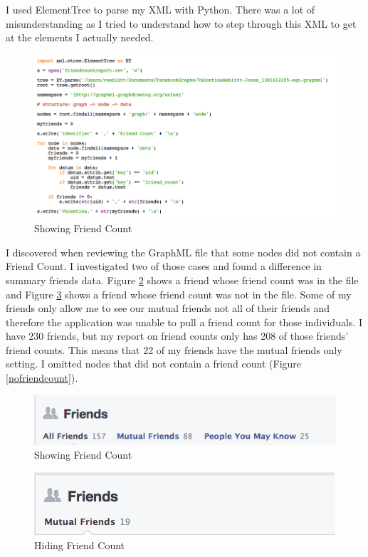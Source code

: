\documentclass{article}
\begin{document}
I used ElementTree to parse my XML with Python. There was a lot of misunderstanding as I tried to understand how to step through this XML to get at the elements I actually needed.


\begin{figure}[H]
\centering
\includegraphics[scale=0.50]{q1/GetFriendCountsCode}
\caption{Showing Friend Count}
\label{GetFriendCountsCode}
\end{figure}

I discovered when reviewing the GraphML file that some nodes did not contain a Friend Count. I investigated two of those cases and found a difference in summary friends data. Figure \ref{showfriendsprofile} shows a friend whose friend count was in the file and Figure \ref{hidefriendsprofile} shows a friend whose friend count was not in the file. Some of my friends only allow me to see our mutual friends not all of their friends and therefore the application was unable to pull a friend count for those individuals. I have 230 friends, but my report on friend counts only has 208 of those friends' friend counts. This means that 22 of my friends have the mutual friends only setting. I omitted nodes that did not contain a friend count (Figure \ref{nofriendcount}).

\begin{figure}[H]
\centering
\includegraphics[scale=0.75]{q1/showfriendsprofile}
\caption{Showing Friend Count}
\label{showfriendsprofile}
\end{figure}

\begin{figure}[H]
\centering
\includegraphics[scale=0.75]{q1/hidefriendsprofile}
\caption{Hiding Friend Count}
\label{hidefriendsprofile}
\end{figure}
\end{document}
